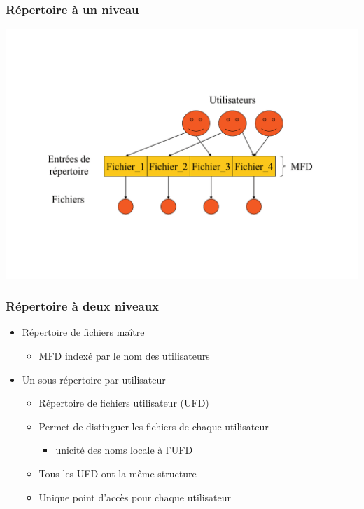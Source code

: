 \begin{frame}
\frametitle{Répertoire à un niveau}
\includegraphics[width=.9\textwidth]{../illustration/repertoire_1niveau.pdf}
\end{frame}

\begin{frame}
\frametitle{Répertoire à deux niveaux}
\begin{itemize}
\item Répertoire de fichiers maître
\begin{itemize}
\item MFD indexé par le nom des utilisateurs
\end{itemize}
\item Un sous répertoire par utilisateur
\begin{itemize}
\item Répertoire de fichiers utilisateur (UFD)
\item Permet de distinguer les fichiers de chaque utilisateur
\begin{itemize}
  \item unicité des noms locale à l'UFD
\end{itemize}
\item Tous les UFD ont la même structure
\item Unique point d'accès pour chaque utilisateur
\end{itemize}
\end{itemize}
\end{frame}

